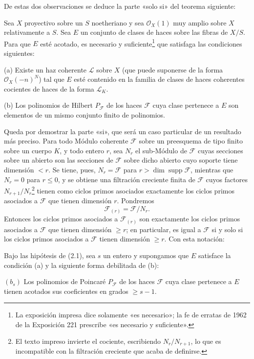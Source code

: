 De estas dos observaciones se deduce la parte «solo si» del teorema siguiente:

 Sea $X$ proyectivo sobre un $S$ noetheriano y sea
$\mathcal O_X(1)$ muy amplio sobre $X$ relativamente a $S$. Sea $E$ un
conjunto de clases de haces sobre las fibras de $X/S$. Para que $E$ esté
acotado, es necesario y suficiente\footnote{La exposición impresa dice
solamente «es necesario»; la fe de erratas de 1962 de la Exposición 221 prescribe «es
necesario y suficiente».} que satisfaga las condiciones siguientes:

\medskip
\noindent (a) Existe un haz coherente $\mathcal L$ sobre $X$ (que puede
suponerse de la forma $\mathcal O_X(-n)^N$) tal que $E$ esté contenido en la
familia de clases de haces coherentes cocientes de haces de la forma
$\mathcal L_K$.

\smallskip
\noindent (b) Los polinomios de Hilbert $P_{\mathcal F}$ de los haces
$\mathcal F$ cuya clase pertenece a $E$ son elementos de un mismo conjunto
finito de polinomios.

Queda por demostrar la parte «si», que será un caso particular de un resultado
más preciso. Para todo Módulo coherente $\mathcal F$ sobre un preesquema de
tipo finito sobre un cuerpo $K$, y todo entero $r$, sea $N_r$ el sub-Módulo de
$\mathcal F$ cuyas secciones sobre un abierto son las secciones de $\mathcal F$
sobre dicho abierto cuyo soporte tiene dimensión $<r$. Se tiene, pues,
$N_r=\mathcal F$ para $r>\dim\operatorname{supp}\mathcal F$, mientras que
$N_r=0$ para $r\leq0$, y se obtiene una filtración creciente finita de
$\mathcal F$ cuyos factores $N_{r+1}/N_r$\footnote{El texto impreso invierte
el cociente, escribiendo $N_r/N_{r+1}$, lo que es incompatible con la
filtración creciente que acaba de definirse.} tienen como ciclos primos
asociados exactamente los ciclos primos asociados a $\mathcal F$ que tienen
dimensión $r$. Pondremos
\[
\mathcal F_{(r)}=\mathcal F/N_r.
\]
Entonces los ciclos primos asociados a $\mathcal F_{(r)}$ son exactamente los
ciclos primos asociados a $\mathcal F$ que tienen dimensión $\geq r$; en
particular, es igual a $\mathcal F$ si y solo si los ciclos primos asociados a
$\mathcal F$ tienen dimensión $\geq r$. Con esta notación:

 Bajo las hipótesis de (2.1), sea $s$ un entero y
supongamos que $E$ satisface la condición (a) y la siguiente forma debilitada
de (b):

\medskip
\noindent $(b_s)$ Los polinomios de Poincaré $P_{\mathcal F}$ de los haces
$\mathcal F$ cuya clase pertenece a $E$ tienen acotados sus coeficientes en
grados $\geq s-1$.

